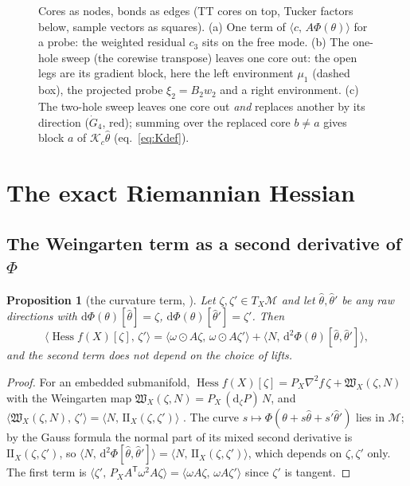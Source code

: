 \documentclass[11pt]{article}
\newcommand{\M}{\mathcal{M}}
\newcommand{\K}{\mathcal{K}}
\newcommand{\W}{\mathfrak{W}}
\newcommand{\Hess}{\operatorname{Hess}}
\newcommand{\T}{\mathsf{T}}
\newcommand{\ip}[2]{\langle #1,\, #2\rangle}
\renewcommand{\th}{\theta}
\newcommand{\thh}{\hat\theta}
\theoremstyle{definition}
\theoremstyle{plain}
\newtheorem{proposition}{Proposition}
\begin{document}
\begin{figure}[t]
\caption{Cores as nodes, bonds as edges (TT cores on top, Tucker factors below, sample vectors as squares).
(a) One term of $\ip{c}{A\Phi(\th)}$ for a probe: the weighted residual $c_3$ sits on the free mode.
(b) The one-hole sweep (the corewise transpose) leaves one core out: the open legs are its gradient block, here
the left environment $\mu_1$ (dashed box), the projected probe $\xi_2=B_2w_2$ and a right environment.
(c) The two-hole sweep leaves one core out \emph{and} replaces another by its direction ($\dot G_4$, red); summing
over the replaced core $b\neq a$ gives block $a$ of $\K_c\thh$ (eq.~\eqref{eq:Kdef}).}
\label{fig:holes}
\end{figure}

\section{The exact Riemannian Hessian}
\label{sec:hessian}

\subsection{The Weingarten term as a second derivative of \texorpdfstring{$\Phi$}{Phi}}

\begin{proposition}[the curvature term, \cite{AMT13}]
\label{prop:weingarten}
Let $\zeta,\zeta'\in T_X\M$ and let $\thh,\thh'$ be any raw directions with $\mathrm d\Phi(\th)[\thh]=\zeta$,
$\mathrm d\Phi(\th)[\thh']=\zeta'$. Then
\begin{equation}
  \label{eq:hess}
  \ip{\Hess f(X)[\zeta]}{\zeta'} = \ip{\omega\odot A\zeta}{\omega\odot A\zeta'}
     + \ip{N}{\mathrm d^2\Phi(\th)[\thh,\thh']},
\end{equation}
and the second term does not depend on the choice of lifts.
\end{proposition}

\begin{proof}
For an embedded submanifold, $\Hess f(X)[\zeta]=P_X\nabla^2 f\,\zeta+\W_X(\zeta,N)$ with the Weingarten map
$\W_X(\zeta,N)=P_X\,(\mathrm d_\zeta P)\,N$, and $\ip{\W_X(\zeta,N)}{\zeta'}=\ip{N}{\mathrm{II}_X(\zeta,\zeta')}$
\cite{AMT13}. The curve $s\mapsto\Phi(\th+s\thh+s'\thh')$ lies in $\M$; by the Gauss formula the normal part of
its mixed second derivative is $\mathrm{II}_X(\zeta,\zeta')$, so
$\ip{N}{\mathrm d^2\Phi[\thh,\thh']}=\ip{N}{\mathrm{II}_X(\zeta,\zeta')}$, which depends on $\zeta,\zeta'$ only. The first
term is $\ip{\zeta'}{P_XA^\T\omega^2A\zeta}=\ip{\omega A\zeta}{\omega A\zeta'}$ since $\zeta'$ is tangent.
\end{proof}
\end{document}

